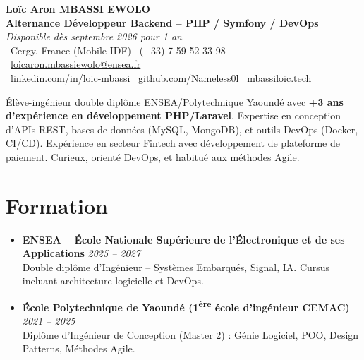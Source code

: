 \documentclass[a4paper,11pt]{article}
\begin{document}
\begin{center}
    {\Large \textbf{Loïc Aron MBASSI EWOLO}} \\ \vspace{4pt}
    \textbf{\large Alternance Développeur Backend -- PHP / Symfony / DevOps} \\
    \textit{\small Disponible dès septembre 2026 pour 1 an} \\ \vspace{4pt}
    \small
    \faMapMarker\ Cergy, France (Mobile IDF) \quad
    \faPhone\ (+33) 7 59 52 33 98 \quad
    \faEnvelope\ \href{mailto:loicaron.mbassiewolo@ensea.fr}{loicaron.mbassiewolo@ensea.fr} \\ \vspace{2pt}
    \faLinkedin\ \href{https://www.linkedin.com/in/loic-mbassi/}{linkedin.com/in/loic-mbassi} \quad
    \faGithub\ \href{https://github.com/Nameless0l}{github.com/Nameless0l} \quad
    \faGlobe\ \href{https://mbassiloic.tech}{mbassiloic.tech}
\end{center}

\vspace{-6pt}

\noindent\small{Élève-ingénieur double diplôme ENSEA/Polytechnique Yaoundé avec \textbf{+3 ans d'expérience en développement PHP/Laravel}. Expertise en conception d'APIs REST, bases de données (MySQL, MongoDB), et outils DevOps (Docker, CI/CD). Expérience en secteur Fintech avec développement de plateforme de paiement. Curieux, orienté DevOps, et habitué aux méthodes Agile.}

\section{Formation}
\begin{itemize}[leftmargin=*, label=\tiny$\bullet$, nosep]
    \item \textbf{ENSEA -- École Nationale Supérieure de l'Électronique et de ses Applications} \hfill \textit{2025 -- 2027} \\
    \small{Double diplôme d'Ingénieur -- Systèmes Embarqués, Signal, IA. Cursus incluant architecture logicielle et DevOps.}
    \item \textbf{École Polytechnique de Yaoundé (1\textsuperscript{ère} école d'ingénieur CEMAC)} \hfill \textit{2021 -- 2025} \\
    \small{Diplôme d'Ingénieur de Conception (Master 2) : Génie Logiciel, POO, Design Patterns, Méthodes Agile.}
\end{itemize}
\end{document}
